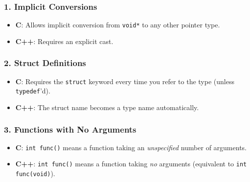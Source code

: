 \hypertarget{implicit-conversions}{%
\subsubsection{1. Implicit Conversions}\label{implicit-conversions}}

\begin{itemize}
\tightlist
\item
  \textbf{C}: Allows implicit conversion from
  \passthrough{\lstinline!void*!} to any other pointer type.
\item
  \textbf{C++}: Requires an explicit cast.
\end{itemize}

\hypertarget{struct-definitions}{%
\subsubsection{2. Struct Definitions}\label{struct-definitions}}

\begin{itemize}
\tightlist
\item
  \textbf{C}: Requires the \passthrough{\lstinline!struct!} keyword
  every time you refer to the type (unless
  \passthrough{\lstinline!typedef!}'d).
\item
  \textbf{C++}: The struct name becomes a type name automatically.
\end{itemize}

\hypertarget{functions-with-no-arguments}{%
\subsubsection{3. Functions with No
Arguments}\label{functions-with-no-arguments}}

\begin{itemize}
\tightlist
\item
  \textbf{C}: \passthrough{\lstinline!int func()!} means a function
  taking an \emph{unspecified} number of arguments.
\item
  \textbf{C++}: \passthrough{\lstinline!int func()!} means a function
  taking \emph{no} arguments (equivalent to
  \passthrough{\lstinline!int func(void)!}).
\end{itemize}

